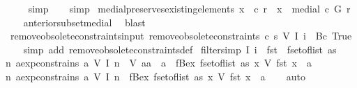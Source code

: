 \begin{isabellebody}
\ \ \ \isamarkupfalse%
\ simp\isanewline
\ \ \isamarkupfalse%
\ simp%
\endisatagproof
{\isafoldproof}%
%
\isadelimproof
\isanewline
%
\endisadelimproof
\isanewline
{}\isamarkupfalse%
\ medial{\isacharunderscore}preserves{\isacharunderscore}existing{\isacharunderscore}elements{\isacharcolon}\ {\isachardoublequoteopen}x\ {\isacharbar}{\isasymin}{\isacharbar}\ c\ r\ {\isasymLongrightarrow}\ x\ {\isacharbar}{\isasymin}{\isacharbar}\ medial\ c\ G\ r\ {\isachardoublequoteclose}\isanewline
%
\isadelimproof
\ \ %
\endisadelimproof
%
\isatagproof
{}\isamarkupfalse%
\ anterior{\isacharunderscore}subset{\isacharunderscore}medial\ \isamarkupfalse%
\ blast%
\endisatagproof
{\isafoldproof}%
%
\isadelimproof
\isanewline
%
\endisadelimproof
\isanewline
{}\isamarkupfalse%
\ remove{\isacharunderscore}obsolete{\isacharunderscore}constraints{\isacharunderscore}input{\isacharcolon}\ {\isachardoublequoteopen}remove{\isacharunderscore}obsolete{\isacharunderscore}constraints\ c\ s\ {\isacharparenleft}V\ {\isacharparenleft}I\ i{\isacharparenright}{\isacharparenright}\ {\isacharequal}\ {\isacharbraceleft}{\isacharbar}Bc\ True{\isacharbar}{\isacharbraceright}{\isachardoublequoteclose}\isanewline
%
\isadelimproof
\ \ %
\endisadelimproof
%
\isatagproof
{}\isamarkupfalse%
\ {\isacharparenleft}simp\ add{\isacharcolon}\ remove{\isacharunderscore}obsolete{\isacharunderscore}constraints{\isacharunderscore}def{\isacharparenright}%
\endisatagproof
{\isafoldproof}%
%
\isadelimproof
\isanewline
%
\endisadelimproof
\isanewline
{}\isamarkupfalse%
\ filter{\isacharunderscore}simp{\isacharcolon}\ {\isachardoublequoteopen}I\ i\ {\isacharbar}{\isasymnotin}{\isacharbar}\ fst\ {\isacharbar}{\isacharbackquote}{\isacharbar}\ fset{\isacharunderscore}of{\isacharunderscore}list\ as\ {\isasymLongrightarrow}\isanewline
{\isacharparenleft}{\isasymexists}n{\isachardot}\ aexp{\isacharunderscore}constrains\ a\ {\isacharparenleft}V\ {\isacharparenleft}I\ n{\isacharparenright}{\isacharparenright}{\isacharparenright}\ {\isasymor}\ V\ aa\ {\isacharequal}\ a\ {\isasymor}\ fBex\ {\isacharparenleft}fset{\isacharunderscore}of{\isacharunderscore}list\ as{\isacharparenright}\ {\isacharparenleft}{\isasymlambda}x{\isachardot}\ V\ {\isacharparenleft}fst\ x{\isacharparenright}\ {\isacharequal}\ a{\isacharparenright}\ {\isacharequal}\isanewline
{\isacharparenleft}{\isasymexists}n{\isachardot}\ aexp{\isacharunderscore}constrains\ a\ {\isacharparenleft}V\ {\isacharparenleft}I\ n{\isacharparenright}{\isacharparenright}{\isacharparenright}\ {\isasymor}\ fBex\ {\isacharparenleft}fset{\isacharunderscore}of{\isacharunderscore}list\ as{\isacharparenright}\ {\isacharparenleft}{\isasymlambda}x{\isachardot}\ V\ {\isacharparenleft}fst\ x{\isacharparenright}\ {\isacharequal}\ a{\isacharparenright}{\isachardoublequoteclose}\isanewline
%
\isadelimproof
\ \ %
\endisadelimproof
%
\isatagproof
{}\isamarkupfalse%
\ auto%
\endisatagproof
{\isafoldproof}%
%
\isadelimproof
\isanewline
%
\endisadelimproof
%
\isadelimtheory
\isanewline
%
\endisadelimtheory
%
\isatagtheory
{}\isamarkupfalse%
%
\endisatagtheory
{\isafoldtheory}%
%
\isadelimtheory
%
\endisadelimtheory
%
\end{isabellebody}%
